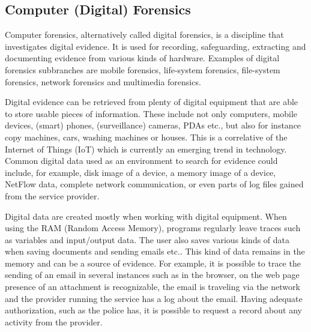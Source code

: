 \subsection{Computer (Digital) Forensics} Computer forensics, alternatively called digital forensics, is a discipline that investigates digital evidence. It is used for recording, safeguarding, extracting and documenting evidence from various kinds of hardware. Examples of digital forensics subbranches are mobile forensics, life-system forensics, file-system forensics, network forensics and multimedia forensics. 

Digital evidence can be retrieved from plenty of digital equipment that are able to store usable pieces of information. These include not only computers, mobile devices, (smart) phones, (surveillance) cameras, PDAs etc., but also for instance copy machines, cars, washing machines or houses. This is a correlative of the Internet of Things (IoT) which is currently an emerging trend in technology. Common digital data used as an environment to search for evidence could include, for example, disk image of a device, a memory image of a device, NetFlow data, complete network communication, or even parts of log files gained from the service provider. 

Digital data are created mostly when working with digital equipment. When using the RAM (Random Access Memory),  programs regularly leave traces such as variables and input/output data. The user also saves various kinds of data when saving documents and sending emails etc.. This kind of data remains in the memory and can be a source of evidence. For example, it is possible to trace the sending of an email in several instances such as in the browser, on the web page presence of an attachment is recognizable, the email is traveling via the network and the provider running the service has a log about the email. Having adequate authorization, such as the police has, it is possible to request a record about any activity from the provider.

